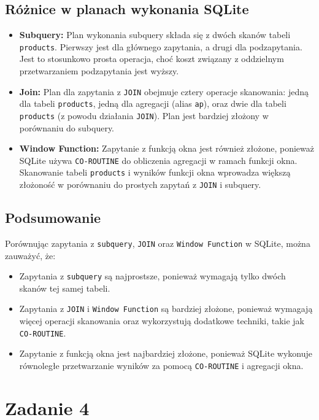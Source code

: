 \documentclass{article}
\begin{document}
\subsection*{Różnice w planach wykonania SQLite}

\begin{itemize}
    \item \textbf{Subquery:} Plan wykonania subquery składa się z dwóch skanów tabeli \texttt{products}. Pierwszy jest dla głównego zapytania, a drugi dla podzapytania. Jest to stosunkowo prosta operacja, choć koszt związany z oddzielnym przetwarzaniem podzapytania jest wyższy.
    \item \textbf{Join:} Plan dla zapytania z \texttt{JOIN} obejmuje cztery operacje skanowania: jedną dla tabeli \texttt{products}, jedną dla agregacji (alias \texttt{ap}), oraz dwie dla tabeli \texttt{products} (z powodu działania \texttt{JOIN}). Plan jest bardziej złożony w porównaniu do subquery.
    \item \textbf{Window Function:} Zapytanie z funkcją okna jest również złożone, ponieważ SQLite używa \texttt{CO-ROUTINE} do obliczenia agregacji w ramach funkcji okna. Skanowanie tabeli \texttt{products} i wyników funkcji okna wprowadza większą złożoność w porównaniu do prostych zapytań z \texttt{JOIN} i subquery.
\end{itemize}

\subsection*{Podsumowanie}

Porównując zapytania z \texttt{subquery}, \texttt{JOIN} oraz \texttt{Window Function} w SQLite, można zauważyć, że:
\begin{itemize}
    \item Zapytania z \texttt{subquery} są najprostsze, ponieważ wymagają tylko dwóch skanów tej samej tabeli.
    \item Zapytania z \texttt{JOIN} i \texttt{Window Function} są bardziej złożone, ponieważ wymagają więcej operacji skanowania oraz wykorzystują dodatkowe techniki, takie jak \texttt{CO-ROUTINE}.
    \item Zapytanie z funkcją okna jest najbardziej złożone, ponieważ SQLite wykonuje równoległe przetwarzanie wyników za pomocą \texttt{CO-ROUTINE} i agregacji okna.
\end{itemize}

\section*{Zadanie 4}
\end{document}
